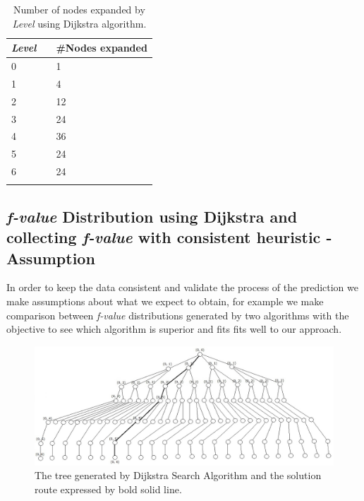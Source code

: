 \documentclass[11pt,a4paper,oneside]{report}
\begin{document}
\footnotesize  %
\setlength\LTleft{100pt}            %
\setlength\LTright{200pt}           %
\begin{longtable}{@{\extracolsep{\fill}} lll @{}} %
\hline
\textit{Level} && \#Nodes expanded \\ \hline
0       && 1                \\ \hline
1       && 4                \\ \hline
2       && 12               \\ \hline
3       && 24               \\ \hline
4       && 36               \\ \hline
5       && 24               \\ \hline
6       && 24               \\ \hline
\caption{Number of nodes expanded by \textit{Level} using Dijkstra algorithm.}
\label{table:tabledijstraExpandedByLevel}
\end{longtable}

\subsection{\textit{f-value} Distribution using Dijkstra and collecting \textit{f-value} with consistent heuristic - Assumption }
In order to keep the data consistent and validate the process of the prediction we make assumptions about what we expect to obtain, for example we make comparison between \textit{f-value} distributions generated by two algorithms with the objective to see which algorithm is superior and fits fits well to our approach.\newline

\begin{figure}[htb]
\begin{center}
\includegraphics[width=12cm]{./image/dijkstraCollecting}
\caption{The tree generated by Dijkstra Search Algorithm and the solution route expressed by bold solid line. }
\label{fig:dijkstraTreeConsistentHeuristic}
\end{center}
\end{figure}
\end{document}
